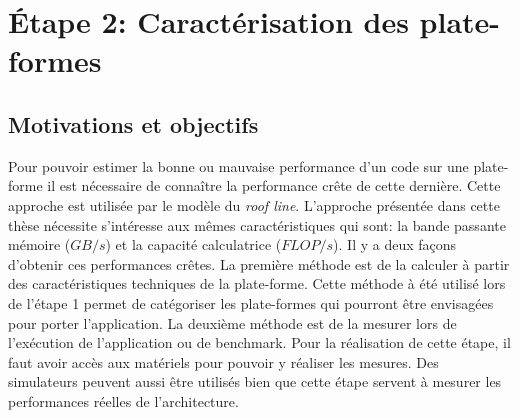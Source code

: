 \section{Étape 2: Caractérisation des plate-formes}

\subsection{Motivations et objectifs}

Pour pouvoir estimer la bonne ou mauvaise performance d'un code sur une plate-forme il est nécessaire de connaître la performance crête de cette dernière. Cette approche est utilisée par le modèle du \textit{roof line}. L'approche présentée dans cette thèse nécessite s'intéresse aux mêmes caractéristiques qui sont: la bande passante mémoire ($GB/s$) et la capacité calculatrice ($FLOP/s$). Il y a deux façons d'obtenir ces performances crêtes. La première méthode est de la calculer à partir des caractéristiques techniques de la plate-forme. Cette méthode à été utilisé lors de l'étape 1 permet de catégoriser les plate-formes qui pourront être envisagées pour porter l'application. La deuxième méthode est de la mesurer lors de l'exécution de l'application ou de benchmark. Pour la réalisation de cette étape, il faut avoir accès aux matériels pour pouvoir y réaliser les mesures. Des simulateurs peuvent aussi être utilisés bien que cette étape servent à mesurer les performances réelles de l'architecture.





